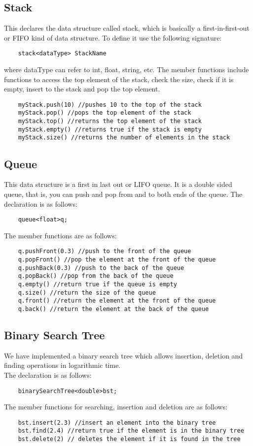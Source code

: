 \documentclass[12pt]{article}
\begin{document}
\subsection{Stack}
This declares the data structure called stack, which is basically a first-in-first-out or FIFO kind of data structure. To define it use the following signature:
\begin{verbatim}
    stack<dataType> StackName
\end{verbatim}
where dataType can refer to int, float, string, etc.
The member functions include functions to access the top element of the stack, check the size, check if it is empty, insert to the stack and pop the top element.
\begin{verbatim}
    myStack.push(10) //pushes 10 to the top of the stack
    myStack.pop() //pops the top element of the stack
    myStack.top() //returns the top element of the stack
    myStack.empty() //returns true if the stack is empty
    myStack.size() //returns the number of elements in the stack
\end{verbatim}

\subsection{Queue}
This data structure is a first in last out or LIFO queue. It is a double sided queue, that is, you can push and pop from and to both ends of the queue.
The declaration is as follows:
\begin{verbatim}
    queue<float>q;
\end{verbatim}
The member functions are as follows:
\begin{verbatim}
    q.pushFront(0.3) //push to the front of the queue
    q.popFront() //pop the element at the front of the queue
    q.pushBack(0.3) //push to the back of the queue
    q.popBack() //pop from the back of the queue
    q.empty() //return true if the queue is empty
    q.size() //return the size of the queue
    q.front() //return the element at the front of the queue
    q.back() //return the element at the back of the queue
\end{verbatim}

\subsection{Binary Search Tree}
We have implemented a binary search tree which allows insertion, deletion and finding operations in logarithmic time.
\\
The declaration is as follows:
\begin{verbatim}
    binarySearchTree<double>bst;
\end{verbatim}
The member functions for searching, insertion and deletion are as follows:
\begin{verbatim}
    bst.insert(2.3) //insert an element into the binary tree
    bst.find(2.4) //return true if the element is in the binary tree
    bst.delete(2) // deletes the element if it is found in the tree
\end{verbatim}
\end{document}
